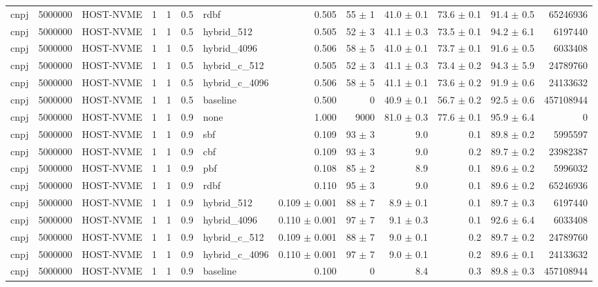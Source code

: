 \begin{tabular}{lllllllrrrrrr}
cnpj & 5000000 & HOST-NVME & 1 & 1 & 0.5 & rdbf & 0.505 & 55 $\pm$ 1 & 41.0 $\pm$ 0.1 & 73.6 $\pm$ 0.1 & 91.4 $\pm$ 0.5 & 65246936 \\
cnpj & 5000000 & HOST-NVME & 1 & 1 & 0.5 & hybrid\_512 & 0.505 & 52 $\pm$ 3 & 41.1 $\pm$ 0.3 & 73.5 $\pm$ 0.1 & 94.2 $\pm$ 6.1 & 6197440 \\
cnpj & 5000000 & HOST-NVME & 1 & 1 & 0.5 & hybrid\_4096 & 0.506 & 58 $\pm$ 5 & 41.0 $\pm$ 0.1 & 73.7 $\pm$ 0.1 & 91.6 $\pm$ 0.5 & 6033408 \\
cnpj & 5000000 & HOST-NVME & 1 & 1 & 0.5 & hybrid\_c\_512 & 0.505 & 52 $\pm$ 3 & 41.1 $\pm$ 0.3 & 73.4 $\pm$ 0.2 & 94.3 $\pm$ 5.9 & 24789760 \\
cnpj & 5000000 & HOST-NVME & 1 & 1 & 0.5 & hybrid\_c\_4096 & 0.506 & 58 $\pm$ 5 & 41.1 $\pm$ 0.1 & 73.6 $\pm$ 0.2 & 91.9 $\pm$ 0.6 & 24133632 \\
cnpj & 5000000 & HOST-NVME & 1 & 1 & 0.5 & baseline & 0.500 & 0 & 40.9 $\pm$ 0.1 & 56.7 $\pm$ 0.2 & 92.5 $\pm$ 0.6 & 457108944 \\
cnpj & 5000000 & HOST-NVME & 1 & 1 & 0.9 & none & 1.000 & 9000 & 81.0 $\pm$ 0.3 & 77.6 $\pm$ 0.1 & 95.9 $\pm$ 6.4 & 0 \\
cnpj & 5000000 & HOST-NVME & 1 & 1 & 0.9 & sbf & 0.109 & 93 $\pm$ 3 & 9.0 & 0.1 & 89.8 $\pm$ 0.2 & 5995597 \\
cnpj & 5000000 & HOST-NVME & 1 & 1 & 0.9 & cbf & 0.109 & 93 $\pm$ 3 & 9.0 & 0.2 & 89.7 $\pm$ 0.2 & 23982387 \\
cnpj & 5000000 & HOST-NVME & 1 & 1 & 0.9 & pbf & 0.108 & 85 $\pm$ 2 & 8.9 & 0.1 & 89.6 $\pm$ 0.2 & 5996032 \\
cnpj & 5000000 & HOST-NVME & 1 & 1 & 0.9 & rdbf & 0.110 & 95 $\pm$ 3 & 9.0 & 0.1 & 89.6 $\pm$ 0.2 & 65246936 \\
cnpj & 5000000 & HOST-NVME & 1 & 1 & 0.9 & hybrid\_512 & 0.109 $\pm$ 0.001 & 88 $\pm$ 7 & 8.9 $\pm$ 0.1 & 0.1 & 89.7 $\pm$ 0.3 & 6197440 \\
cnpj & 5000000 & HOST-NVME & 1 & 1 & 0.9 & hybrid\_4096 & 0.110 $\pm$ 0.001 & 97 $\pm$ 7 & 9.1 $\pm$ 0.3 & 0.1 & 92.6 $\pm$ 6.4 & 6033408 \\
cnpj & 5000000 & HOST-NVME & 1 & 1 & 0.9 & hybrid\_c\_512 & 0.109 $\pm$ 0.001 & 88 $\pm$ 7 & 9.0 $\pm$ 0.1 & 0.2 & 89.7 $\pm$ 0.2 & 24789760 \\
cnpj & 5000000 & HOST-NVME & 1 & 1 & 0.9 & hybrid\_c\_4096 & 0.110 $\pm$ 0.001 & 97 $\pm$ 7 & 9.0 $\pm$ 0.1 & 0.2 & 89.6 $\pm$ 0.1 & 24133632 \\
cnpj & 5000000 & HOST-NVME & 1 & 1 & 0.9 & baseline & 0.100 & 0 & 8.4 & 0.3 & 89.8 $\pm$ 0.3 & 457108944 \\

\end{tabular}
